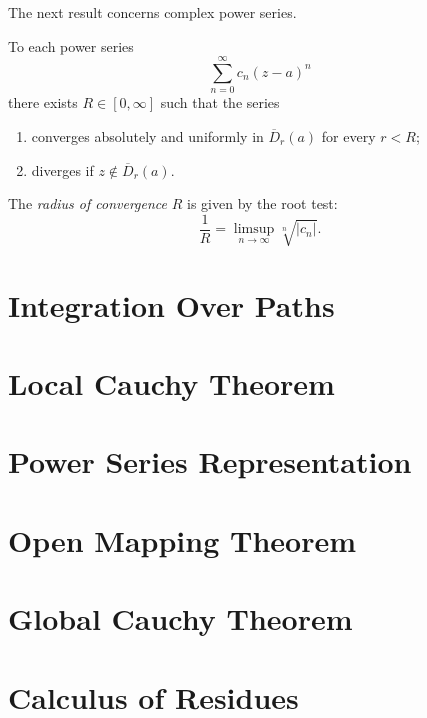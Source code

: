 \begin{lemma}

\end{lemma}

\begin{example}[Polynomials]

\end{example}

The next result concerns complex power series.
\begin{lemma}
To each power series
\[\sum_{n=0}^{\infty}c_n(z-a)^n\]
there exists $R\in[0,\infty]$ such that the series
\begin{enumerate}[label=(\roman*)]
\item converges absolutely and uniformly in $\overline{D}_r(a)$ for every $r<R$;
\item diverges if $z\notin\overline{D}_r(a)$.
\end{enumerate}
The \emph{radius of convergence} $R$ is given by the root test:
\[\frac{1}{R}=\limsup_{n\to\infty}\sqrt[n]{|c_n|}.\]
\end{lemma}

\section{Integration Over Paths}
\section{Local Cauchy Theorem}
\section{Power Series Representation}
\section{Open Mapping Theorem}
\section{Global Cauchy Theorem}
\section{Calculus of Residues}